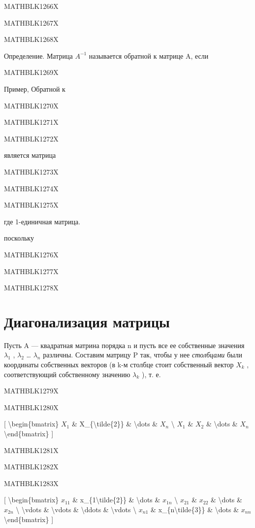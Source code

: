 \documentclass[
]{article}
\begin{document}
{{{MATHBLK1266X

MATHBLK1267X

MATHBLK1268X

Определение. Матрица \(A^{-1}\) называется обратной к матрице A, если

MATHBLK1269X

Пример, Обратной к

MATHBLK1270X

MATHBLK1271X

MATHBLK1272X

является матрица

MATHBLK1273X

MATHBLK1274X

MATHBLK1275X

где 1-единичная матрица.

поскольку

MATHBLK1276X

MATHBLK1277X

MATHBLK1278X

\section{Диагонализация
матрицы}\label{ux434ux438ux430ux433ux43eux43dux430ux43bux438ux437ux430ux446ux438ux44f-ux43cux430ux442ux440ux438ux446ux44b}

Пусть A --- квадратная матрина порядка n и пусть все ее собственные
значения \(\lambda_1\) , \(\lambda_2\) \ldots{} \(\lambda_n\) различны.
Составим матрицу P так, чтобы у нее \emph{столбцами} были координаты
собственных векторов (в k-м столбце стоит собственный вектор \(X_k\) ,
соответствующий собственному значению \(\lambda_k\) ), т. е.

MATHBLK1279X

MATHBLK1280X

{[} \textbackslash begin\{bmatrix\} \(X_1\) \&
X\_\{\textbackslash tilde\{2\}\} \& \textbackslash dots \& \(X_n\)
\textbackslash{} \(X_{1}\) \& \(X_{2}\) \& \textbackslash dots \&
\(X_n\) \textbackslash end\{bmatrix\} {]}

MATHBLK1281X

MATHBLK1282X

MATHBLK1283X

{[} \textbackslash begin\{bmatrix\} \(x_{11}\) \&
x\_\{1\textbackslash tilde\{2\}\} \& \textbackslash dots \& \(x_{1n}\)
\textbackslash{} \(x_{21}\) \& \(x_{22}\) \& \textbackslash dots \&
\(x_{2n}\) \textbackslash{} \textbackslash vdots \& \textbackslash vdots
\& \textbackslash ddots \& \textbackslash vdots \textbackslash{}
\(x_{n1}\) \& x\_\{n\textbackslash tilde\{3\}\} \& \textbackslash dots
\& \(x_{nn}\) \textbackslash end\{bmatrix\} {]}

}}}
\end{document}
